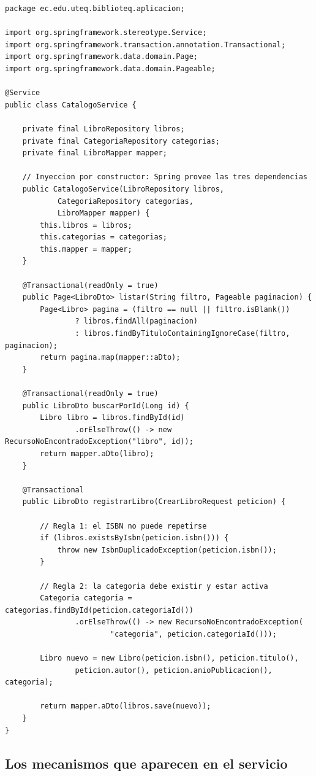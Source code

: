 \documentclass[11pt,a4paper,openany]{book}
\begin{document}
\begin{lstlisting}[style=java,caption={Servicio del catalogo con sus reglas de negocio.},label={lst:servicio}]
package ec.edu.uteq.biblioteq.aplicacion;

import org.springframework.stereotype.Service;
import org.springframework.transaction.annotation.Transactional;
import org.springframework.data.domain.Page;
import org.springframework.data.domain.Pageable;

@Service
public class CatalogoService {

	private final LibroRepository libros;
	private final CategoriaRepository categorias;
	private final LibroMapper mapper;

	// Inyeccion por constructor: Spring provee las tres dependencias
	public CatalogoService(LibroRepository libros,
			CategoriaRepository categorias,
			LibroMapper mapper) {
		this.libros = libros;
		this.categorias = categorias;
		this.mapper = mapper;
	}

	@Transactional(readOnly = true)
	public Page<LibroDto> listar(String filtro, Pageable paginacion) {
		Page<Libro> pagina = (filtro == null || filtro.isBlank())
				? libros.findAll(paginacion)
				: libros.findByTituloContainingIgnoreCase(filtro, paginacion);
		return pagina.map(mapper::aDto);
	}

	@Transactional(readOnly = true)
	public LibroDto buscarPorId(Long id) {
		Libro libro = libros.findById(id)
				.orElseThrow(() -> new RecursoNoEncontradoException("libro", id));
		return mapper.aDto(libro);
	}

	@Transactional
	public LibroDto registrarLibro(CrearLibroRequest peticion) {

		// Regla 1: el ISBN no puede repetirse
		if (libros.existsByIsbn(peticion.isbn())) {
			throw new IsbnDuplicadoException(peticion.isbn());
		}

		// Regla 2: la categoria debe existir y estar activa
		Categoria categoria = categorias.findById(peticion.categoriaId())
				.orElseThrow(() -> new RecursoNoEncontradoException(
						"categoria", peticion.categoriaId()));

		Libro nuevo = new Libro(peticion.isbn(), peticion.titulo(),
				peticion.autor(), peticion.anioPublicacion(), categoria);

		return mapper.aDto(libros.save(nuevo));
	}
}
\end{lstlisting}

\subsection{Los mecanismos que aparecen en el servicio}
\label{sec:mecanismos-servicio}
\end{document}
